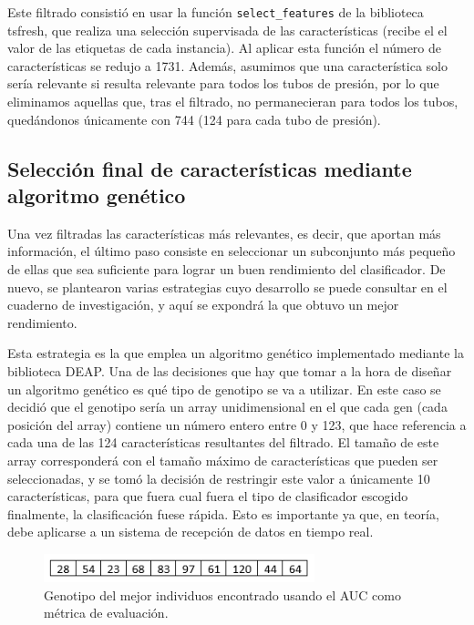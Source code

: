 Este filtrado consistió en usar la función \texttt{select\_features} de la biblioteca tsfresh, que realiza una selección supervisada de las características (recibe el el valor de las etiquetas de cada instancia). Al aplicar esta función el número de características se redujo a 1731. Además, asumimos que una característica solo sería relevante si resulta relevante para todos los tubos de presión, por lo que eliminamos aquellas que, tras el filtrado, no permanecieran para todos los tubos, quedándonos únicamente con 744 (124 para cada tubo de presión).  

\subsection{Selección final de características mediante algoritmo genético}

Una vez filtradas las características más relevantes, es decir, que aportan más información, el último paso consiste en seleccionar un subconjunto más pequeño de ellas que sea suficiente para lograr un buen rendimiento del clasificador. De nuevo, se plantearon varias estrategias cuyo desarrollo se puede consultar en el cuaderno de investigación, y aquí se expondrá la que obtuvo un mejor rendimiento. 

Esta estrategia es la que emplea un algoritmo genético implementado mediante la biblioteca DEAP. Una de las decisiones que hay que tomar a la hora de diseñar un algoritmo genético es qué tipo de genotipo se va a utilizar. En este caso se decidió que el genotipo sería un array unidimensional en el que cada gen (cada posición del array) contiene un número entero entre 0 y 123, que hace referencia a cada una de las 124 características resultantes del filtrado. El tamaño de este array corresponderá con el tamaño máximo de características que pueden ser seleccionadas, y se tomó la decisión de restringir este valor a únicamente 10 características, para que fuera cual fuera el tipo de clasificador escogido finalmente, la clasificación fuese rápida. Esto es importante ya que, en teoría, debe aplicarse a un sistema de recepción de datos en tiempo real. 

\begin{figure}[H]
	\centering
	\includegraphics[width=0.7\textwidth]{../img/genotipo.png}
	\caption{Genotipo del mejor individuos encontrado usando el AUC como métrica de evaluación.}
	\label{fig:genotipo}
\end{figure}

